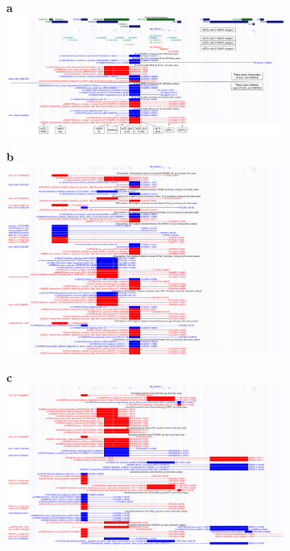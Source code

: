 \begin{figure}[!ht]
    \centering

    \begin{subfigure}[]{0.99\textwidth}
        \textbf{a}
        \\
        \includegraphics[width=\textwidth]{fig/ucsc_gwas2eqtl_il4_bcell_help.png}
    \end{subfigure}

    \begin{subfigure}[]{0.99\textwidth}
        \textbf{b}
        \\
        \includegraphics[width=\textwidth]{fig/ucsc_gwas2eqtl_il4_monocyte.png}
    \end{subfigure}

    \begin{subfigure}[]{0.99\textwidth}
        \textbf{c}
        \\
        \includegraphics[width=\textwidth]{fig/ucsc_gwas2eqtl_il4_frontalcortex.png}
    \end{subfigure}

    \caption{}
%
\end{figure}

